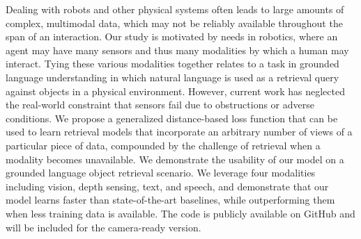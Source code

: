 Dealing with robots and other physical systems often leads to large amounts of complex, multimodal data, which may not be reliably available throughout the span of an interaction. Our study is motivated by needs in robotics, where an agent may have many sensors and thus many modalities by which a human may interact. Tying these various modalities together relates to a task in grounded language understanding in which natural language is used as a retrieval query against objects in a physical environment. However, current work has neglected the real-world constraint that sensors fail due to obstructions or adverse conditions. We propose a generalized distance-based loss function that can be used to learn retrieval models that incorporate an arbitrary number of views of a particular piece of data, compounded by the challenge of retrieval when a modality becomes unavailable. We demonstrate the usability of our model on a grounded language object retrieval scenario. We leverage four modalities including vision, depth sensing, text, and speech, and demonstrate that our model learns faster than state-of-the-art baselines, while outperforming them when less training data is available. The code is publicly available on GitHub and will be included for the camera-ready version.